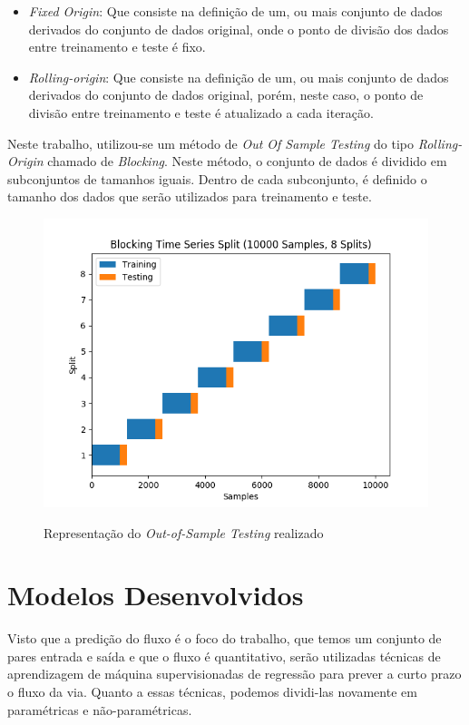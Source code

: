 \begin{itemize}
    \item \textit{Fixed Origin}: Que consiste na definição de um, ou mais conjunto de dados derivados do conjunto de dados original, onde o ponto de divisão dos dados entre treinamento e teste é fixo.
    \item \textit{Rolling-origin}: Que consiste na definição de um, ou mais conjunto de dados derivados do conjunto de dados original, porém, neste caso, o ponto de divisão entre treinamento e teste é atualizado a cada iteração.
\end{itemize}

Neste trabalho, utilizou-se um método de \textit{Out Of Sample Testing} do tipo \textit{Rolling-Origin} chamado de \textit{Blocking}. Neste método, o conjunto de dados é dividido em subconjuntos de tamanhos iguais. Dentro de cada subconjunto, é definido o tamanho dos dados que serão utilizados para treinamento e teste.

\begin{figure}[htbp]
    \centering
    \includegraphics[scale=0.9]{monography/img/methods/blocking_cv.png}
    \label{figure:blocking}
    \caption[Representação do \textit{Out-of-Sample Testing} realizado]{Representação do \textit{Out-of-Sample Testing} realizado}
\end{figure}

\section{Modelos Desenvolvidos}

Visto que a predição do fluxo é o foco do trabalho, que temos um conjunto de pares entrada e saída e que o fluxo é quantitativo, serão utilizadas técnicas de aprendizagem de máquina supervisionadas de regressão para prever a curto prazo o fluxo da via. Quanto a essas técnicas, podemos dividi-las novamente em paramétricas e não-paramétricas.

